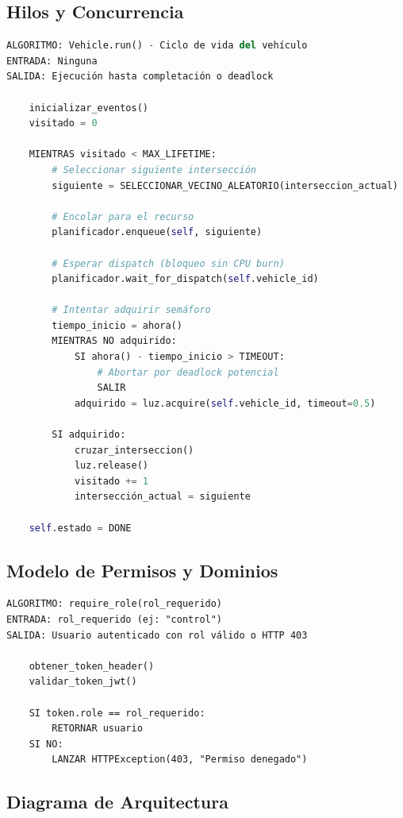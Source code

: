 \documentclass[12pt,a4paper]{article}
\begin{document}
\subsection{Hilos y Concurrencia}

\begin{lstlisting}[language=python, caption=Vehículo como Hilo]
ALGORITMO: Vehicle.run() - Ciclo de vida del vehículo
ENTRADA: Ninguna
SALIDA: Ejecución hasta completación o deadlock

    inicializar_eventos()
    visitado = 0
    
    MIENTRAS visitado < MAX_LIFETIME:
        # Seleccionar siguiente intersección
        siguiente = SELECCIONAR_VECINO_ALEATORIO(interseccion_actual)
        
        # Encolar para el recurso
        planificador.enqueue(self, siguiente)
        
        # Esperar dispatch (bloqueo sin CPU burn)
        planificador.wait_for_dispatch(self.vehicle_id)
        
        # Intentar adquirir semáforo
        tiempo_inicio = ahora()
        MIENTRAS NO adquirido:
            SI ahora() - tiempo_inicio > TIMEOUT:
                # Abortar por deadlock potencial
                SALIR
            adquirido = luz.acquire(self.vehicle_id, timeout=0.5)
        
        SI adquirido:
            cruzar_interseccion()
            luz.release()
            visitado += 1
            intersección_actual = siguiente
    
    self.estado = DONE
\end{lstlisting}

\subsection{Modelo de Permisos y Dominios}

\begin{lstlisting}[python, caption=Middleware de Autorización]
ALGORITMO: require_role(rol_requerido)
ENTRADA: rol_requerido (ej: "control")
SALIDA: Usuario autenticado con rol válido o HTTP 403

    obtener_token_header()
    validar_token_jwt()
    
    SI token.role == rol_requerido:
        RETORNAR usuario
    SI NO:
        LANZAR HTTPException(403, "Permiso denegado")
\end{lstlisting}

\subsection{Diagrama de Arquitectura}
\end{document}
